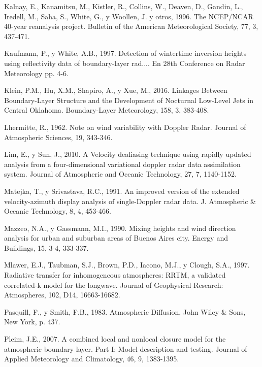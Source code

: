 \documentclass[12pt,spanish,oneside]{book}
\begin{document}
\hypertarget{ref-Kalnay1996}{}
Kalnay, E., Kanamitsu, M., Kistler, R., Collins, W., Deaven, D., Gandin,
L., Iredell, M., Saha, S., White, G., y Woollen, J. y otros, 1996. The
NCEP/NCAR 40-year reanalysis project. Bulletin of the American
Meteorological Society, 77, 3, 437-471.

\hypertarget{ref-Kaufmann1997}{}
Kaufmann, P., y White, A.B., 1997. Detection of wintertime inversion
heights using reflectivity data of boundary-layer rad.... En 28th
Conference on Radar Meteorology pp. 4-6.

\hypertarget{ref-Klein2016}{}
Klein, P.M., Hu, X.M., Shapiro, A., y Xue, M., 2016. Linkages Between
Boundary-Layer Structure and the Development of Nocturnal Low-Level Jets
in Central Oklahoma. Boundary-Layer Meteorology, 158, 3, 383-408.

\hypertarget{ref-Lhermitte1962}{}
Lhermitte, R., 1962. Note on wind variability with Doppler Radar.
Journal of Atmospheric Sciences, 19, 343-346.

\hypertarget{ref-Lim2010}{}
Lim, E., y Sun, J., 2010. A Velocity dealiasing technique using rapidly
updated analysis from a four-dimensional variational doppler radar data
assimilation system. Journal of Atmospheric and Oceanic Technology, 27,
7, 1140-1152.

\hypertarget{ref-Matejka1991}{}
Matejka, T., y Srivastava, R.C., 1991. An improved version of the
extended velocity-azimuth display analysis of single-Doppler radar data.
J. Atmospheric \& Oceanic Technology, 8, 4, 453-466.

\hypertarget{ref-Mazzeo1990}{}
Mazzeo, N.A., y Gassmann, M.I., 1990. Mixing heights and wind direction
analysis for urban and suburban areas of Buenos Aires city. Energy and
Buildings, 15, 3-4, 333-337.

\hypertarget{ref-Mlawer1997}{}
Mlawer, E.J., Taubman, S.J., Brown, P.D., Iacono, M.J., y Clough, S.A.,
1997. Radiative transfer for inhomogeneous atmospheres: RRTM, a
validated correlated-k model for the longwave. Journal of Geophysical
Research: Atmospheres, 102, D14, 16663-16682.

\hypertarget{ref-Pasquill1983}{}
Pasquill, F., y Smith, F.B., 1983. Atmospheric Diffusion, John Wiley \&
Sons, New York, p. 437.

\hypertarget{ref-Pleim2007}{}
Pleim, J.E., 2007. A combined local and nonlocal closure model for the
atmospheric boundary layer. Part I: Model description and testing.
Journal of Applied Meteorology and Climatology, 46, 9, 1383-1395.
\end{document}
